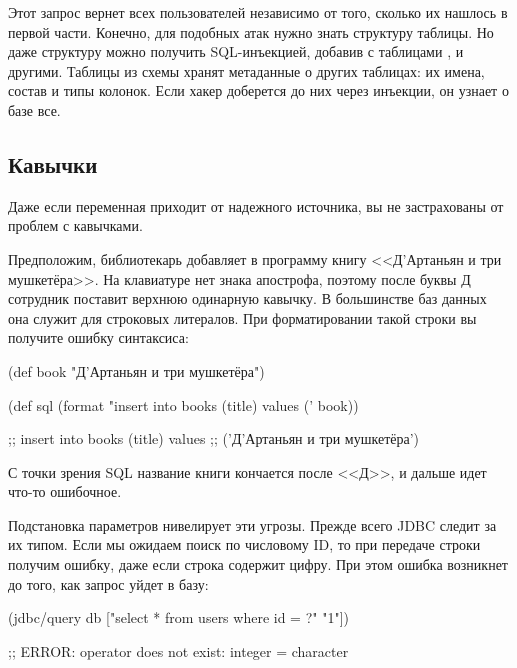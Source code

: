 Этот запрос вернет всех пользователей независимо от того, сколько их нашлось в первой части. Конечно, для подобных атак нужно знать структуру таблицы. Но даже структуру можно получить SQL-инъекцией, добавив  с таблицами ,  и другими. Таблицы из схемы  хранят метаданные о других таблицах: их имена, состав и типы колонок. Если хакер доберется до них через инъекции, он узнает о базе все.

\iflarge\vspace{3mm}\fi

\subsection{Кавычки}


Даже если переменная приходит от надежного источника, вы не застрахованы от проблем с кавычками.

Предположим, библиотекарь добавляет в программу книгу <<Д’Артаньян и три мушкетёра>>. На клавиатуре нет знака апострофа, поэтому после буквы Д сотрудник поставит верхнюю одинарную кавычку. В большинстве баз данных она служит для строковых литералов. При форматировании такой строки вы получите ошибку синтаксиса:

  \begin{clojure}
(def book "Д'Артаньян и три мушкетёра")

(def sql
  (format "insert into books (title) values ('%
          book))

;; insert into books (title) values
;; ('Д'Артаньян и три мушкетёра')
  \end{clojure}

С точки зрения SQL название книги кончается после <<Д>>, и дальше идет что-то ошибочное.

Подстановка параметров нивелирует эти угрозы. Прежде всего JDBC следит за их типом. Если мы ожидаем поиск по числовому ID, то при передаче строки получим ошибку, даже если строка содержит цифру. При этом ошибка возникнет до того, как запрос уйдет в базу:

\begin{english}
  \begin{clojure}
(jdbc/query db ["select * from users where id = ?" "1"])

;; ERROR: operator does not exist: integer = character
  \end{clojure}
\end{english}

